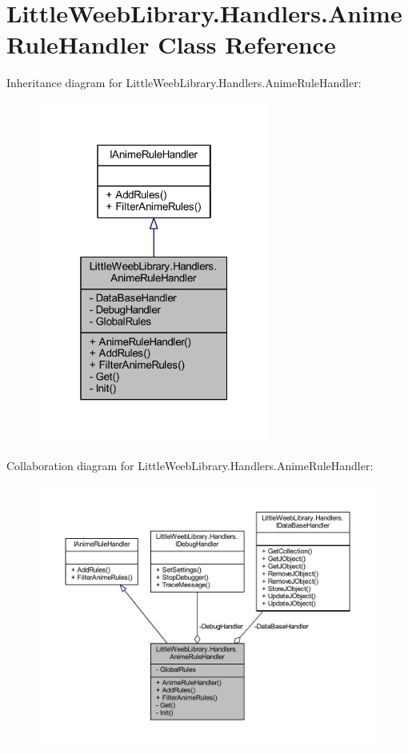 \hypertarget{class_little_weeb_library_1_1_handlers_1_1_anime_rule_handler}{}\section{Little\+Weeb\+Library.\+Handlers.\+Anime\+Rule\+Handler Class Reference}
\label{class_little_weeb_library_1_1_handlers_1_1_anime_rule_handler}


Inheritance diagram for Little\+Weeb\+Library.\+Handlers.\+Anime\+Rule\+Handler\+:\nopagebreak
\begin{figure}[H]
\begin{center}
\leavevmode
\includegraphics[width=217pt]{class_little_weeb_library_1_1_handlers_1_1_anime_rule_handler__inherit__graph}
\end{center}
\end{figure}


Collaboration diagram for Little\+Weeb\+Library.\+Handlers.\+Anime\+Rule\+Handler\+:\nopagebreak
\begin{figure}[H]
\begin{center}
\leavevmode
\includegraphics[width=350pt]{class_little_weeb_library_1_1_handlers_1_1_anime_rule_handler__coll__graph}
\end{center}
\end{figure}
